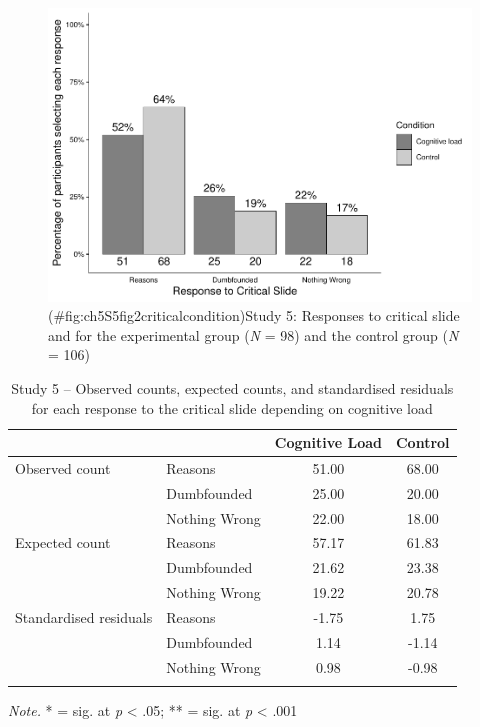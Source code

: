 \documentclass[
  american,
  man,floatsintext]{apa7}
\begin{document}
\begin{figure}
\centering
\includegraphics{Study_5_files/figure-latex/ch5S5fig2criticalcondition-1.pdf}
\caption{(\#fig:ch5S5fig2criticalcondition)Study 5: Responses to critical slide and for the experimental group (\emph{N} = 98) and the control group (\emph{N} = 106)}
\end{figure}

\begin{table}[tbp]

\begin{center}
\begin{threeparttable}

\caption{\label{tab:S5tab1dumb}Study 5 – Observed counts, expected counts, and standardised residuals for each response to the critical slide depending on cognitive load}

\begin{tabular}{llcc}
\toprule
 & \multicolumn{1}{c}{} & \multicolumn{1}{c}{Cognitive Load} & \multicolumn{1}{c}{Control}\\
\midrule
Observed count & Reasons & 51.00 & 68.00\\
 & Dumbfounded & 25.00 & 20.00\\
 & Nothing Wrong & 22.00 & 18.00\\
Expected count & Reasons & 57.17 & 61.83\\
 & Dumbfounded & 21.62 & 23.38\\
 & Nothing Wrong & 19.22 & 20.78\\
Standardised residuals & Reasons & -1.75 & 1.75\\
 & Dumbfounded & 1.14 & -1.14\\
 & Nothing Wrong & 0.98 & -0.98\\
\bottomrule
\addlinespace
\end{tabular}

\begin{tablenotes}[para]
\normalsize{\textit{Note.} * = sig. at \emph{p} < .05; ** = sig. at \emph{p} < .001}
\end{tablenotes}

\end{threeparttable}
\end{center}

\end{table}
\end{document}
